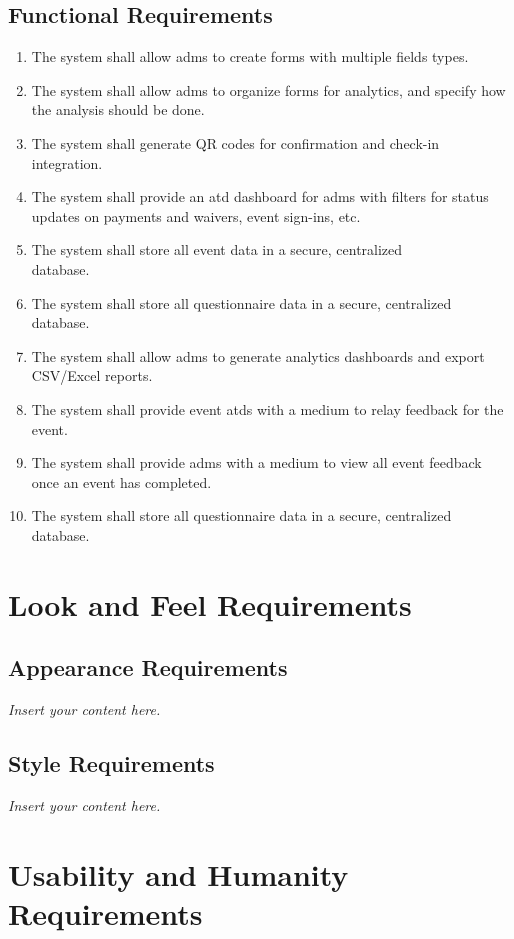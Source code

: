\documentclass[12pt]{article}
\newcommand{\lips}{\textit{Insert your content here.}}
\begin{document}
\subsection{Functional Requirements}
\begin{enumerate}[align=left,
  leftmargin=*,
  labelsep=1em,
  itemindent=0em,
  label=\bfseries FR-\arabic*:]
  \item The system shall allow \glspl{adm} to create forms with multiple fields types.
  \item The system shall allow \glspl{adm} to organize forms for analytics, and specify how
    the analysis should be done.
  \item The system shall generate QR codes for confirmation and check-in integration.
  \item The system shall provide an \gls{atd} dashboard for \glspl{adm} with filters
    for status updates on payments and waivers, event sign-ins, etc.
  \item The system shall store all event data in a secure, centralized\\database.
  \item The system shall store all questionnaire data in a secure, centralized database.
  \item The system shall allow \glspl{adm} to generate analytics dashboards and export
    CSV/Excel reports.
  \item The system shall provide event \glspl{atd} with a medium to relay feedback for the
    event.
  \item The system shall provide \glspl{adm} with a medium to view all event feedback
    once an event has completed.
  \item{The system shall store all questionnaire data in a secure, centralized database.}
\end{enumerate}

\section{Look and Feel Requirements}
\subsection{Appearance Requirements}
\lips
\subsection{Style Requirements}
\lips

\section{Usability and Humanity Requirements}
\end{document}
